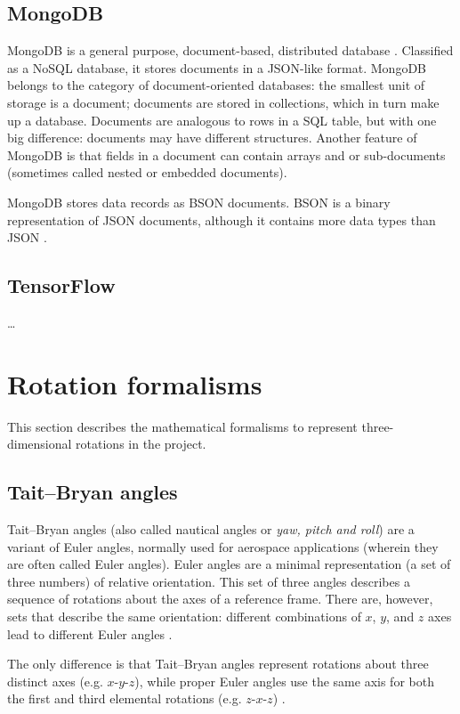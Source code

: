 \subsection{MongoDB}
MongoDB is a general purpose, document-based, distributed database \cite{MongoDB}. Classified as a NoSQL database, it stores documents in a JSON-like format. MongoDB belongs to the category of document-oriented databases: the smallest unit of storage is a document; documents are stored in collections, which in turn make up a database. Documents are analogous to rows in a SQL table, but with one big difference: documents may have different structures. Another feature of MongoDB is that fields in a document can contain arrays and or sub-documents (sometimes called nested or embedded documents).

MongoDB stores data records as BSON documents. BSON is a binary representation of JSON documents, although it contains more data types than JSON \cite{BSONSpec}.

\subsection{TensorFlow}
\dots

\section{Rotation formalisms}
This section describes the mathematical formalisms to represent three-dimensional rotations in the project.

\subsection{Tait–Bryan angles}
Tait–Bryan angles (also called nautical angles or \textit{yaw, pitch and roll}) are a variant of Euler angles, normally used for aerospace applications (wherein they are often called Euler angles). Euler angles are a minimal representation (a set of three numbers) of relative orientation. This set of three angles describes a sequence of rotations about the axes of a reference frame. There are, however, sets that describe the same orientation: different combinations of $x$, $y$, and $z$ axes lead to different Euler angles \cite{Rob20}.

The only difference is that Tait–Bryan angles represent rotations about three distinct axes (e.g. $x$-$y$-$z$), while proper Euler angles use the same axis for both the first and third elemental rotations (e.g. $z$-$x$-$z$) \cite{WikipediaEulerAngles}.

